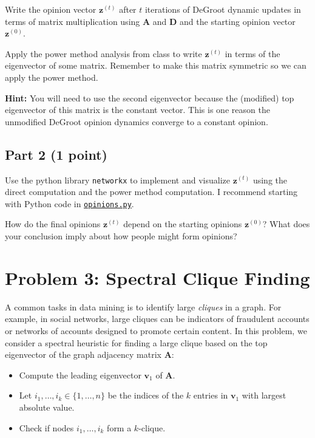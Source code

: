 \documentclass{article}
\begin{document}
Write the opinion vector $\mathbf{z}^{(t)}$ after $t$ iterations of DeGroot dynamic updates in terms of matrix multiplication using $\mathbf{A}$ and $\mathbf{D}$ and the starting opinion vector $\mathbf{z}^{(0)}$.

Apply the power method analysis from class to write $\mathbf{z}^{(t)}$ in terms of the eigenvector of some matrix. Remember to make this matrix symmetric so we can apply the power method.

\textbf{Hint:} You will need to use the second eigenvector because the (modified) top eigenvector of this matrix is the constant vector. This is one reason the unmodified DeGroot opinion dynamics converge to a constant opinion.

\subsection*{Part 2 (1 point)}

Use the python library \texttt{networkx} to implement and visualize $\mathbf{z}^{(t)}$ using the direct computation and the power method computation. I recommend starting with Python code in \href{https://www.rtealwitter.com/rads2024/psets/opinions.py}{\texttt{opinions.py}}.

How do the final opinions $\mathbf{z}^{(t)}$ depend on the starting opinions $\mathbf{z}^{(0)}$? What does your conclusion imply about how people might form opinions?

%

\section*{Problem 3: Spectral Clique Finding}
A common tasks in data mining is to identify large \emph{cliques} in a graph. For example, in social networks, large cliques can be indicators of fraudulent accounts or networks of accounts designed to promote certain content. In this problem, we consider a spectral heuristic for finding a large clique based on the top eigenvector of the graph adjacency matrix $\mathbf{A}$: 
\begin{itemize}
	\item Compute the leading eigenvector $\mathbf{v}_1$ of $\mathbf{A}$. 
	\item Let $i_1, \ldots, i_k \in \{1, \ldots, n\}$ be the indices of the $k$ entries in $\mathbf{v}_1$ with largest absolute value. 
	\item Check if nodes $i_1, \ldots, i_k$ form a $k$-clique.
\end{itemize}
\end{document}
